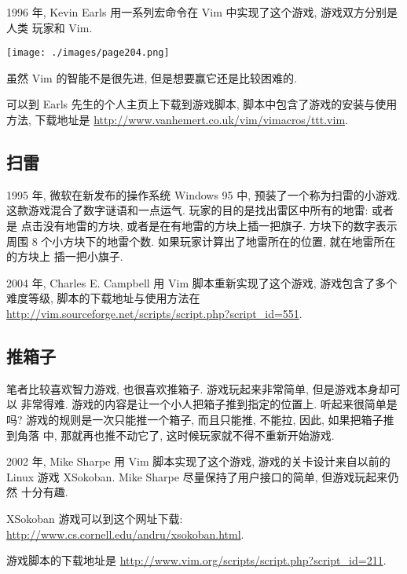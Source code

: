 1996 年, Kevin Earls 用一系列宏命令在 Vim 中实现了这个游戏, 游戏双方分别是人类
玩家和 Vim.

\begin{center}
    \texttt{[image: ./images/page204.png]}
\end{center}

虽然 Vim 的智能不是很先进, 但是想要赢它还是比较困难的.

可以到 Earls 先生的个人主页上下载到游戏脚本, 脚本中包含了游戏的安装与使用方法,
下载地址是 \url{http://www.vanhemert.co.uk/vim/vimacros/ttt.vim}.

\subsection{扫雷}
\label{subsec:mines}

1995 年, 微软在新发布的操作系统 Windows 95 中, 预装了一个称为扫雷的小游戏.
这款游戏混合了数字谜语和一点运气. 玩家的目的是找出雷区中所有的地雷: 或者是
点击没有地雷的方块, 或者是在有地雷的方块上插一把旗子. 方块下的数字表示周围
8 个小方块下的地雷个数. 如果玩家计算出了地雷所在的位置, 就在地雷所在的方块上
插一把小旗子.

2004 年, Charles E. Campbell 用 Vim 脚本重新实现了这个游戏, 游戏包含了多个
难度等级, 脚本的下载地址与使用方法在
\url{http://vim.sourceforge.net/scripts/script.php?script_id=551}.

\subsection{推箱子}
\label{subsec:sokoban}

笔者比较喜欢智力游戏, 也很喜欢推箱子. 游戏玩起来非常简单, 但是游戏本身却可以
非常得难. 游戏的内容是让一个小人把箱子推到指定的位置上. 听起来很简单是吗?
游戏的规则是一次只能推一个箱子, 而且只能推, 不能拉, 因此, 如果把箱子推到角落
中, 那就再也推不动它了, 这时候玩家就不得不重新开始游戏.

2002 年, Mike Sharpe 用 Vim 脚本实现了这个游戏, 游戏的关卡设计来自以前的
Linux 游戏 XSokoban. Mike Sharpe 尽量保持了用户接口的简单, 但游戏玩起来仍然
十分有趣.

\begin{warning}
    XSokoban 游戏可以到这个网址下载:
    \url{http://www.cs.cornell.edu/andru/xsokoban.html}.
\end{warning}

游戏脚本的下载地址是 \url{http://www.vim.org/scripts/script.php?script_id=211}.

